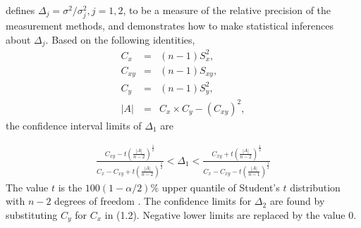 \documentclass[12pt, a4paper]{report}
\theoremstyle{plain}
\theoremstyle{definition}
\theoremstyle{remark}
\begin{document}

\citet{Thompson} defines $\Delta_j = \sigma^2 / \sigma^2_j, j=1,2$, to be a measure of the
relative precision of the measurement methods, and demonstrates how to make statistical inferences about $\Delta_{j}$.
Based on the following identities,
\begin{eqnarray*}
	C_{x}&=&(n-1)S^2_{x},\nonumber\\
	C_{xy}&=&(n-1)S_{xy},\nonumber\\
	C_{y}&=&(n-1)S^2_{y},\nonumber\\
	|A| &=& C_{x}\times C_{y} - (C_{xy})^2,\nonumber
\end{eqnarray*}
\noindent the confidence interval limits of $\Delta_{1}$ are

\begin{eqnarray}
\frac{C_{xy}-
	t(\frac{|A|}{n-2})^{\frac{1}{2}}}{C_{x}-C_{xy}+
	t(\frac{|A|}{n-2})^{\frac{1}{2}}} <
\Delta_{1} < \frac{C_{xy}+
	t(\frac{|A|}{n-2})^{\frac{1}{2}}}{C_{x}-C_{xy}-
	t(\frac{|A|}{n-1})^{\frac{1}{2}}} \nonumber
\end{eqnarray}
The value $t$ is the $100(1-\alpha/2)\%$ upper quantile of
Student's $t$ distribution with $n-2$ degrees of freedom
\citep{Kinsella}. The confidence limits for $\Delta_{2}$ are found by substituting $C_{y}$ for $C_{x}$ in (1.2).
Negative lower limits are replaced by the value $0$.


\end{document}
